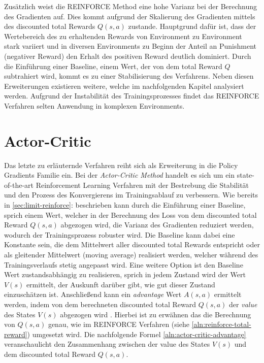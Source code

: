 \documentclass[11pt]{scrartcl}
\begin{document}
Zusätzlich weist die REINFORCE Method eine hohe Varianz bei der Berechnung des Gradienten auf.
Dies kommt aufgrund der Skalierung des Gradienten mittels des discounted total Rewards $Q(s,a)$ zustande.
Hauptgrund dafür ist, dass der Wertebereich des zu erhaltenden Rewards von Environment zu Environment
stark variiert und in diversen Environments zu Beginn der Anteil an Punishment (negativer Reward) den
Erhalt des positiven Reward deutlich dominiert. Durch die Einführung einer Baseline, einem Wert, der
von dem total Reward $Q$ subtrahiert wird, kommt es zu einer Stabilisierung des Verfahrens. Neben
diesen Erweiterungen existieren weitere, welche im nachfolgenden Kapitel analysiert werden. Aufgrund
der Instabilität des Trainingsprozesses findet das REINFORCE Verfahren selten Anwendung in komplexen
Environments.   
\newpage


\section{Actor-Critic}
Das letzte zu erläuternde Verfahren reiht sich als Erweiterung in die Policy Gradients Familie ein.
Bei der \textit{Actor-Critic Method} handelt es sich um ein state-of-the-art Reinforcement Learning
Verfahren mit der Bestrebung die Stabilität und den Prozess des Konvergierens im Trainingsablauf
zu verbessern. Wie bereits in \autoref{sec:limit-reinforce}:  beschrieben
kann durch die Einführung einer Baseline, sprich einem Wert, welcher in der Berechnung des Loss von dem
discounted total Reward $Q(s,a)$ abgezogen wird, die Varianz des Gradienten reduziert werden, wodurch
der Trainingsprozess robuster wird. Die Baseline kann dabei eine Konstante sein, die dem Mittelwert 
aller discounted total Rewards entspricht oder als gleitender Mittelwert (moving average) realisiert
werden, welcher während des Trainingsverlaufs stetig angepasst wird. Eine weitere Option ist den Baseline
Wert zustandsabhängig zu realisieren, sprich in jedem Zustand wird der Wert $V(s)$ ermittelt, der Auskunft
darüber gibt, wie gut dieser Zustand einzuschätzen ist. Anschließend kann ein \textit{advantage} Wert
$A(s,a)$ ermittelt werden, indem von dem berechneten discounted total Reward $Q(s,a)$ der \textit{value}
des States $V(s)$ abgezogen wird \cite[~S.268 ff.]{L2018}. Hierbei ist zu erwähnen das die Berechnung von
$Q(s,a)$ genau, wie im REINFORCE Verfahren (siehe \autoref{aln:reinforce-total-reward}) umgesetzt wird.
Die nachfolgende Formel \ref{aln:actor-critic-advantage} veranschaulicht den Zusammenhang zwischen der
value des States $V(s)$ und dem discounted total Reward $Q(s,a)$.
\end{document}

